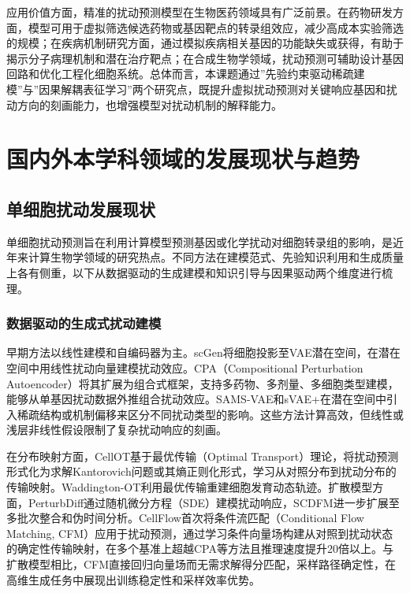 应用价值方面，精准的扰动预测模型在生物医药领域具有广泛前景。在药物研发方面，模型可用于虚拟筛选候选药物或基因靶点的转录组效应，减少高成本实验筛选的规模\cite{tejada2025causal}；在疾病机制研究方面，通过模拟疾病相关基因的功能缺失或获得，有助于揭示分子病理机制和潜在治疗靶点\cite{uhler2024building}；在合成生物学领域，扰动预测可辅助设计基因回路和优化工程化细胞系统。总体而言，本课题通过”先验约束驱动稀疏建模”与”因果解耦表征学习”两个研究点，既提升虚拟扰动预测对关键响应基因和扰动方向的刻画能力，也增强模型对扰动机制的解释能力。

\clearpage
\section{国内外本学科领域的发展现状与趋势}

\subsection{单细胞扰动发展现状}

单细胞扰动预测旨在利用计算模型预测基因或化学扰动对细胞转录组的影响，是近年来计算生物学领域的研究热点。不同方法在建模范式、先验知识利用和生成质量上各有侧重，以下从数据驱动的生成建模和知识引导与因果驱动两个维度进行梳理。

\subsubsection{数据驱动的生成式扰动建模}

早期方法以线性建模和自编码器为主。scGen\cite{lotfollahi2019scgen}将细胞投影至VAE潜在空间，在潜在空间中用线性扰动向量建模扰动效应。CPA（Compositional Perturbation Autoencoder）\cite{lotfollahi2023contextualization}将其扩展为组合式框架，支持多药物、多剂量、多细胞类型建模，能够从单基因扰动数据外推组合扰动效应。SAMS-VAE\cite{bereket2023sams}和sVAE+\cite{lopez2022svae}在潜在空间中引入稀疏结构或机制偏移来区分不同扰动类型的影响。这些方法计算高效，但线性或浅层非线性假设限制了复杂扰动响应的刻画。

在分布映射方面，CellOT\cite{bunne2023learning}基于最优传输（Optimal Transport）理论，将扰动预测形式化为求解Kantorovich问题或其熵正则化形式，学习从对照分布到扰动分布的传输映射。Waddington-OT\cite{schiebinger2019optimal}利用最优传输重建细胞发育动态轨迹。扩散模型方面，PerturbDiff\cite{roman2024perturbdiff}通过随机微分方程（SDE）建模扰动响应，SCDFM\cite{wu2025scdfm}进一步扩展至多批次整合和伪时间分析。CellFlow\cite{huguet2024cellflow}首次将条件流匹配（Conditional Flow Matching, CFM）\cite{lipman2022flow}应用于扰动预测，通过学习条件向量场构建从对照到扰动状态的确定性传输映射，在多个基准上超越CPA等方法且推理速度提升20倍以上。与扩散模型相比，CFM直接回归向量场而无需求解得分匹配，采样路径确定性，在高维生成任务中展现出训练稳定性和采样效率优势\cite{liu2022flow}。

